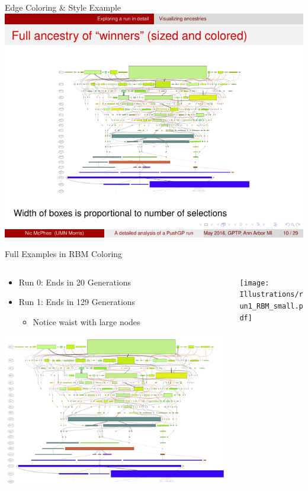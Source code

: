 \documentclass{beamer}
\begin{document}
\begin{frame}{Edge Coloring \& Style Example}
				\includegraphics[width=\textwidth]{Illustrations/run0_colored_detail.pdf}
\end{frame}

\begin{frame}{Full Examples in RBM Coloring}
\begin{columns}
\begin{column}{.6\textwidth}
\center
\begin{itemize}
\item Run 0: Ends in 20 Generations
\item Run 1: Ends in 129 Generations
\begin{itemize}
\item Notice waist with large nodes
\end{itemize}
\end{itemize}
\includegraphics[width=\textwidth]{Illustrations/run0_RBM_color_full_30000.pdf} 
\end{column}
\begin{column}{.45\textwidth}
\center
\texttt{[image: Illustrations/run1\_RBM\_small.pdf]} 
\end{column}
\end{columns}
\end{frame}
\end{document}
